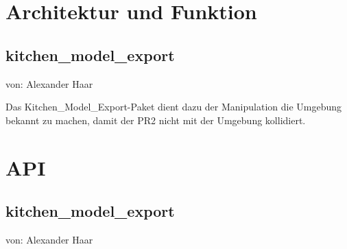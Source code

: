 \documentclass{suturo}
\begin{document}

\makeatletter
\newcommand{\chapterauthor}[1]{%
  {\parindent0pt\vspace*{-47pt}%
  \linespread{2.2}\large\begin{flushright}von: #1\end{flushright}%
  \par\nobreak\vspace*{0pt}}
  \@afterheading%
}
\makeatother

\section{Architektur und Funktion}
\subsection{kitchen\_model\_export}
\chapterauthor{Alexander Haar}
Das Kitchen\_Model\_Export-Paket dient dazu der Manipulation die Umgebung bekannt zu machen, damit der PR2 nicht mit der Umgebung kollidiert.

\begin{figure}[!htb]
\end{figure}
      
\section{API}
\subsection{kitchen\_model\_export}
\chapterauthor{Alexander Haar}
\end{document}
